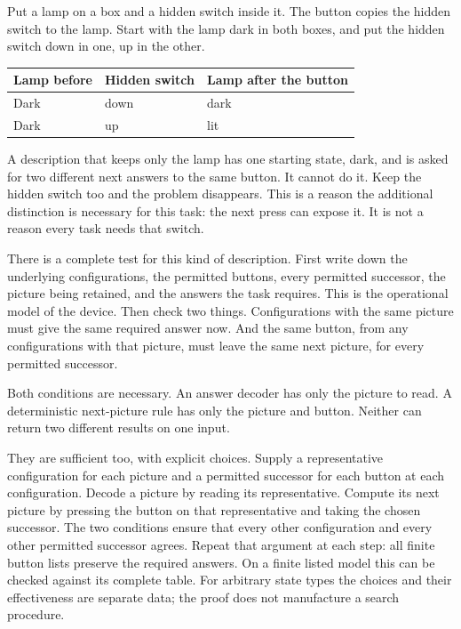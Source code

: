 \documentclass[11pt,twoside]{article}
\theoremstyle{thielethm}
\theoremstyle{thieledef}
\theoremstyle{thieledef}
\theoremstyle{thieledef}
\theoremstyle{thielethm}
\theoremstyle{thieleobs}
\theoremstyle{thielethm}
\begin{document}
Put a lamp on a box and a hidden switch inside it. The button copies the
hidden switch to the lamp. Start with the lamp dark in both boxes, and
put the hidden switch down in one, up in the other.

\begin{center}
\begin{tabular}{@{}lll@{}}
Lamp before & Hidden switch & Lamp after the button \\ \hline
Dark & down & dark \\
Dark & up & lit \\ \hline
\end{tabular}
\end{center}

A description that keeps only the lamp has one starting state, dark,
and is asked for two different next answers to the same button. It cannot
do it. Keep the hidden switch too and the problem disappears. This is a
reason the additional distinction is necessary for this task: the next
press can expose it. It is not a reason every task needs that switch.


There is a complete test for this kind of description. First write down
the underlying configurations, the permitted buttons, every permitted
successor, the picture being retained, and the answers the task requires.
This is the operational model of the device. Then check two things.
Configurations with the same picture must give the same required answer
now. And the same button, from any configurations with that picture, must
leave the same next picture, for every permitted successor.

Both conditions are necessary. An answer decoder has only the picture to
read. A deterministic next-picture rule has only the picture and button.
Neither can return two different results on one input.

They are sufficient too, with explicit choices. Supply a representative
configuration for each picture and a permitted successor for each button
at each configuration. Decode a picture by reading its representative.
Compute its next picture by pressing the button on that representative
and taking the chosen successor. The two conditions ensure that every
other configuration and every other permitted successor agrees. Repeat
that argument at each step: all finite button lists preserve the required
answers. On a finite listed model this can be checked against its complete
table. For arbitrary state types the choices and their effectiveness are
separate data; the proof does not manufacture a search procedure.
\end{document}
